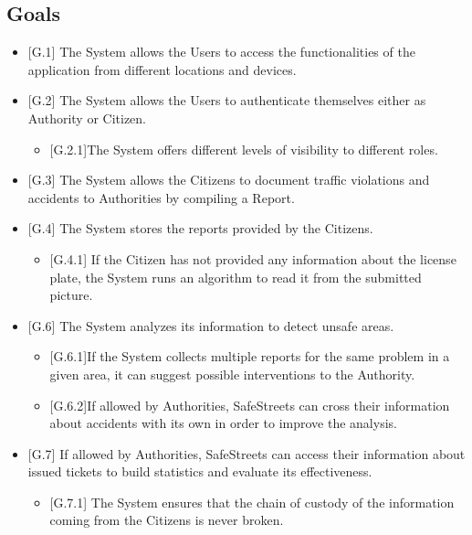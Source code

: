 \documentclass{report}
\begin{document}
\subsection{Goals}
\begin{itemize}
    \item {[G.1]} The System allows the Users to access the functionalities of the application from different locations and devices.
    \item {[G.2]} The System allows the Users to authenticate themselves either as Authority or Citizen.
    \begin{itemize}
    		\item {[G.2.1]}The System offers different levels of visibility to different roles.
    \end{itemize}
    \item {[G.3]} The System allows the Citizens to document traffic violations and accidents to Authorities by compiling a Report.
    \item {[G.4]} The System stores the reports provided by the Citizens.
    \begin{itemize}
    		\item {[G.4.1]} If the Citizen has not provided any information about the license plate, the System runs an algorithm to read it from the submitted picture.
    	\end{itemize}     
    \item {[G.6]} The System analyzes its information to detect unsafe areas.
    \begin{itemize}
    		\item {[G.6.1]}If the System collects multiple reports for the same problem in a given area, it can suggest possible interventions to the Authority.
    		\item {[G.6.2]}If allowed by Authorities, SafeStreets can cross their information about accidents with its own in order to improve the analysis.
    \end{itemize}    
    \item{[G.7]} If allowed by Authorities, SafeStreets can access their information about issued tickets to build statistics and evaluate its effectiveness.
    \begin{itemize}
        \item {[G.7.1]} The System ensures that the chain of custody of the information coming from the Citizens is never broken.
    \end{itemize}
\end{itemize}
\end{document}
